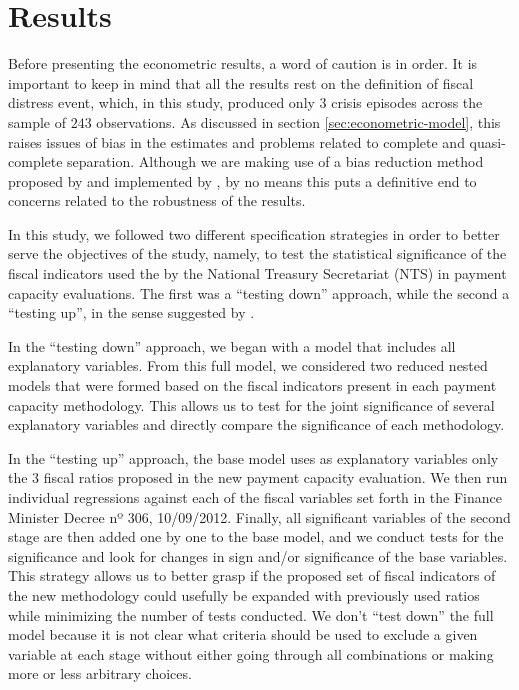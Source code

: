 \chapter{Results}
\label{sec:results}

Before presenting the econometric results, a word of caution is in order. It is important to keep in mind that all the results rest on the definition of fiscal distress event, which, in this study, produced only $3$ crisis episodes across the sample of $243$ observations. As discussed in section \ref{sec:econometric-model}, this raises issues of bias in the estimates and problems related to complete and quasi-complete separation. Although we are making use of a bias reduction method proposed by \citet{firth1993} and implemented by \citet{brglm}, by no means this puts a definitive end to concerns related to the robustness of the results.

In this study, we followed two different specification strategies in order to better serve the objectives of the study, namely, to test the statistical significance of the fiscal indicators used the by the National Treasury Secretariat (NTS) in payment capacity evaluations. The first was a ``testing down'' approach, while the second a ``testing up'', in the sense suggested by \citet{kennedy2008}. 

In the ``testing down'' approach, we began with a model that includes all explanatory variables. From this full model, we considered two reduced nested models that were formed based on the fiscal indicators present in each payment capacity methodology. This allows us to test for the joint significance of several explanatory variables and directly compare the significance of each methodology.

In the ``testing up'' approach, the base model uses as explanatory variables only the $3$ fiscal ratios proposed in the new payment capacity evaluation. We then run individual regressions against each of the fiscal variables set forth in the Finance Minister Decree nº 306, 10/09/2012. Finally, all significant variables of the second stage are then added one by one to the base model, and we conduct tests for the significance and look for changes in sign and/or significance of the base variables. This strategy allows us to better grasp if the proposed set of fiscal indicators of the new methodology could usefully be expanded with previously used ratios while minimizing the number of tests conducted. We don't ``test down'' the full model because it is not clear what criteria should be used to exclude a given variable at each stage without either going through all combinations or making more or less arbitrary choices.

